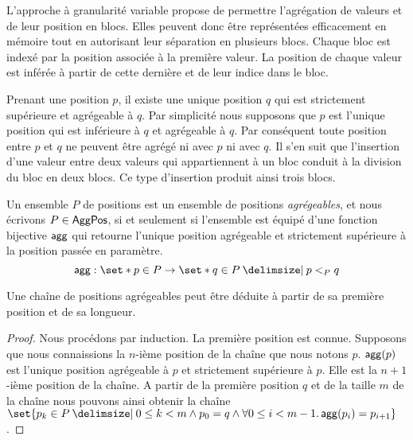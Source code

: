 L'approche à granularité variable propose de permettre l'agrégation de valeurs et de leur position en blocs.
Elles peuvent donc être représentées efficacement en mémoire tout en autorisant leur séparation en plusieurs blocs.
Chaque bloc est indexé par la position associée à la première valeur.
La position de chaque valeur est inférée à partir de cette dernière et de leur indice dans le bloc.

Prenant une position $p$, il existe une unique position $q$ qui est strictement supérieure et agrégeable à $q$.
Par simplicité nous supposons que $p$ est l'unique position qui est inférieure à $q$ et agrégeable à $q$.
Par conséquent toute position entre $p$ et $q$ ne peuvent être agrégé ni avec $p$ ni avec $q$.
Il s'en suit que l'insertion d'une valeur entre deux valeurs qui appartiennent à un bloc conduit à la division du bloc en deux blocs.
Ce type d'insertion produit ainsi trois blocs.

\begin{definition}\label{def:offest-positions}
Un ensemble $P$ de positions est un ensemble de positions \emph{agrégeables}, et nous écrivons $P \in \operatorname{\mathsf{AggPos}}$, si et seulement si l'ensemble est équipé d'une fonction bijective $\operatorname{\mathsf{agg}}$ qui retourne l'unique position agrégeable et strictement supérieure à la position passée en paramètre.
\begin{equation*}
    \trm{agg}: \set*{p \in P} \to \set*{q \in P \given p <_P q}
\end{equation*}
\end{definition}

\begin{theorem}
Une chaîne de positions agrégeables peut être déduite à partir de sa première position et de sa longueur.
\end{theorem}

\begin{proof}
Nous procédons par induction. La première position est connue. Supposons que nous connaissions la $n$-ième position de la chaîne que nous notons $p$.
$\operatorname{\mathsf{agg}}(p)$ est l'unique position agrégeable à $p$ et strictement supérieure à $p$.
Elle est la $n+1$-ième position de la chaîne.
A partir de la première position $q$ et de la taille $m$ de la chaîne nous pouvons ainsi obtenir la chaîne $\set{p_k \in P \given 0 \leq k < m \land p_0 = q \land \forall 0 \leq i < m-1 \qsep \trm{agg}(p_i) = p_{i+1}}$.
\end{proof}

